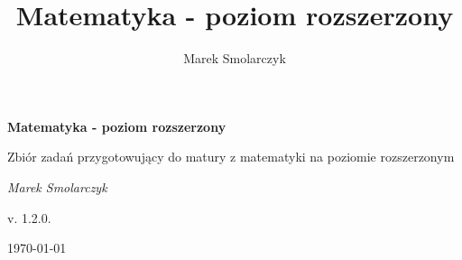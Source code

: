 \documentclass[a4paper,12pt]{book}
\begin{document}
\frontmatter

\begin{titlepage}
	\centering
	{ \bfseries \LARGE Matematyka - poziom rozszerzony \par }
	\vspace{1cm}
	{ \large Zbiór zadań przygotowujący do matury z matematyki na poziomie rozszerzonym \par }
	\vspace{3cm}
	{ \itshape \large Marek Smolarczyk \par }
	\vfill
	{ \large v. 1.2.0. \par }
	\vspace{0.2cm}
	{ \large \today \par }
\end{titlepage}

\author{Marek Smolarczyk}
\title{Matematyka - poziom rozszerzony}

\tableofcontents

\mainmatter


\backmatter
\end{document}

